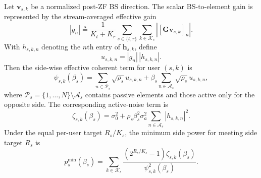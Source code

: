 \documentclass[journal]{IEEEtran}
\begin{document}
Let $\mathbf v_{s,k}$ be a normalized post-ZF BS direction. The scalar BS-to-element gain is represented by the stream-averaged effective gain
\[
|g_n|\triangleq \frac{1}{K_t+K_r}\sum_{s\in\{t,r\}}\sum_{k\in\mathcal{K}_s}|[\mathbf{G}\mathbf v_{s,k}]_n|.
\]
With $h_{s,k,n}$ denoting the $n$th entry of $\mathbf{h}_{s,k}$, define
\begin{equation}
u_{s,k,n} = |g_n|\,|h_{s,k,n}|.
\label{eq:un}
\end{equation}
Then the side-wise effective coherent term for user $(s,k)$ is
\begin{equation}
\psi_{s,k}(\beta_s)=
\sum_{n\in\mathcal{P}_s}\sqrt{\rho_s}u_{s,k,n}
+\beta_s\sum_{n\in\mathcal{A}_s}\sqrt{\rho_s}u_{s,k,n},
\label{eq:psi}
\end{equation}
where $\mathcal{P}_s=\{1,\ldots,N\}\setminus\mathcal{A}_s$ contains passive elements and those active only for the opposite side. The corresponding active-noise term is
\begin{equation}
\zeta_{s,k}(\beta_s)=\sigma_0^2+
\rho_s\beta_s^2\sigma_a^2
\sum_{n\in\mathcal{A}_s}|h_{s,k,n}|^2.
\label{eq:noise_exact}
\end{equation}
Under the equal per-user target $R_s/K_s$, the minimum side power for meeting side target $R_s$ is
\begin{equation}
p_s^{\min}(\beta_s)=
\sum_{k\in\mathcal{K}_s}
\frac{(2^{R_s/K_s}-1)\zeta_{s,k}(\beta_s)}{\psi_{s,k}^2(\beta_s)}.
\label{eq:minsidepower}
\end{equation}
\end{document}
